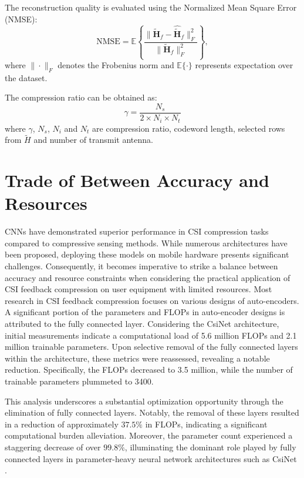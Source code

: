 \documentclass[lettersize,journal]{IEEEtran}
\begin{document}
The reconstruction quality is evaluated using the Normalized Mean Square Error (NMSE):
\[
\text{NMSE} = \mathbb{E}\left\{\frac{\|\tilde{\mathbf{H}}_f - \hat{\tilde{\mathbf{H}}}_f\|_F^2}{\|\tilde{\mathbf{H}}_f\|_F^2}\right\},
\]
where $\|\cdot\|_F$ denotes the Frobenius norm and $\mathbb{E}\{\cdot\}$ represents expectation over the dataset.

The compression ratio can be obtained as:
\[
\gamma = \frac{N_{s}}{2\times N_{i}\times N_{t}}  
\]
where $\gamma$, $N_{s}$, $N_{i}$ and $N_{t}$ are compression ratio, codeword length, selected rows from $\tilde{H}$ and number of transmit antenna.


\section{Trade of Between Accuracy and Resources} 
CNNs have demonstrated superior performance in CSI compression tasks compared to compressive sensing methods. While numerous architectures have been proposed, deploying these models on mobile hardware presents significant challenges. Consequently, it becomes imperative to strike a balance between accuracy and resource constraints when considering the practical application of CSI feedback compression on user equipment with limited resources.
Most research in CSI feedback compression focuses on various designs of auto-encoders. A significant portion of the parameters and FLOPs in auto-encoder designs is attributed to the fully connected layer. Considering the CsiNet \cite{abe} architecture, initial measurements indicate a computational load of 5.6 million FLOPs and 2.1 million trainable parameters. Upon selective removal of the fully connected layers within the architecture, these metrics were reassessed, revealing a notable reduction. Specifically, the FLOPs decreased to 3.5 million, while the number of trainable parameters plummeted to 3400.

This analysis underscores a substantial optimization opportunity through the elimination of fully connected layers. Notably, the removal of these layers resulted in a reduction of approximately 
\begin{math}37.5\%\end{math} in FLOPs, indicating a significant computational burden alleviation. Moreover, the parameter count experienced a staggering decrease of over \begin{math}99.8\%\end{math}, illuminating the dominant role played by fully connected layers in parameter-heavy neural network architectures such as CsiNet \cite{abe}.
\end{document}
